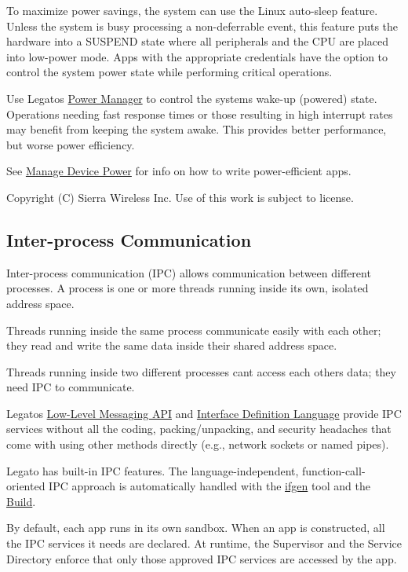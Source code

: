 To maximize power savings, the system can use the Linux auto-\/sleep feature. Unless the system is busy processing a non-\/deferrable event, this feature puts the hardware into a {\ttfamily S\+U\+S\+P\+E\+N\+D} state where all peripherals and the C\+P\+U are placed into low-\/power mode. Apps with the appropriate credentials have the option to control the system power state while performing critical operations.

Use Legato\textquotesingle{}s \hyperlink{c_pm}{Power Manager} to control the system\textquotesingle{}s wake-\/up (powered) state. Operations needing fast response times or those resulting in high interrupt rates may benefit from keeping the system awake. This provides better performance, but worse power efficiency.

See \hyperlink{howToPowerMgmt}{Manage Device Power} for info on how to write power-\/efficient apps.





Copyright (C) Sierra Wireless Inc. Use of this work is subject to license. \hypertarget{basicIPC}{}\subsection{Inter-\/process Communication}\label{basicIPC}
Inter-\/process communication (I\+P\+C) allows communication between different processes. A process is one or more threads running inside its own, isolated address space.

Threads running inside the same process communicate easily with each other; they read and write the same data inside their shared address space.

Threads running inside two different processes can\textquotesingle{}t access each other\textquotesingle{}s data; they need I\+P\+C to communicate.

Legato\textquotesingle{}s \hyperlink{c_messaging}{Low-\/\+Level Messaging A\+P\+I} and \hyperlink{interfaceDefLang}{Interface Definition Language} provide I\+P\+C services without all the coding, packing/unpacking, and security headaches that come with using other methods directly (e.\+g., network sockets or named pipes).

Legato has built-\/in I\+P\+C features. The language-\/independent, function-\/call-\/oriented I\+P\+C approach is automatically handled with the \hyperlink{buildToolsifgen}{ifgen} tool and the \hyperlink{buildTools}{Build}.

By default, each app runs in its own sandbox. When an app is constructed, all the I\+P\+C services it needs are declared. At runtime, the Supervisor and the Service Directory enforce that only those approved I\+P\+C services are accessed by the app.

